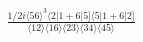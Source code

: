 \documentclass[varwidth, border=5pt]{standalone}
\begin{document}
\begin{my}
$\begin{gathered}
\scriptscriptstyle\frac{1/2i\langle56\rangle^3\langle2|1+6|5]\langle5|1+6|2]}{\langle12\rangle\langle16\rangle\langle23\rangle\langle34\rangle\langle45\rangle}
\end{gathered}$
\end{my}
\end{document}
